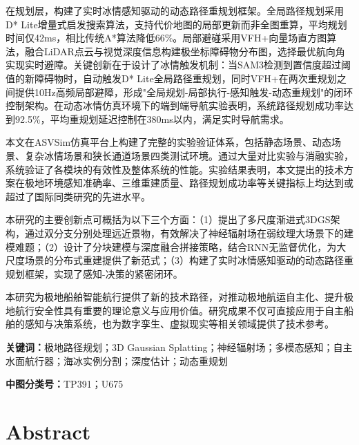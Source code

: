 \documentclass[12pt,a4paper]{ctexbook}
\begin{document}
在规划层，构建了实时冰情感知驱动的动态路径重规划框架。全局路径规划采用D* Lite增量式启发搜索算法，支持代价地图的局部更新而非全图重算，平均规划时间仅42ms，相比传统A*算法降低66\%。局部避碰采用VFH+向量场直方图算法，融合LiDAR点云与视觉深度信息构建极坐标障碍物分布图，选择最优航向角实现实时避障。关键创新在于设计了冰情触发机制：当SAM3检测到置信度超过阈值的新障碍物时，自动触发D* Lite全局路径重规划，同时VFH+在两次重规划之间提供10Hz高频局部避障，形成"全局规划-局部执行-感知触发-动态重规划"的闭环控制架构。在动态冰情仿真环境下的端到端导航实验表明，系统路径规划成功率达到92.5\%，平均重规划延迟控制在380ms以内，满足实时导航需求。

本文在ASVSim仿真平台上构建了完整的实验验证体系，包括静态场景、动态场景、复杂冰情场景和狭长通道场景四类测试环境。通过大量对比实验与消融实验，系统验证了各模块的有效性及整体系统的性能。实验结果表明，本文提出的技术方案在极地环境感知准确率、三维重建质量、路径规划成功率等关键指标上均达到或超过了国际同类研究的先进水平。

本研究的主要创新点可概括为以下三个方面：（1）提出了多尺度渐进式3DGS架构，通过双分支分别处理远近景物，有效解决了神经辐射场在弱纹理大场景下的建模难题；（2）设计了分块建模与深度融合拼接策略，结合RNN无监督优化，为大尺度场景的分布式重建提供了新范式；（3）构建了实时冰情感知驱动的动态路径重规划框架，实现了感知-决策的紧密闭环。

本研究为极地船舶智能航行提供了新的技术路径，对推动极地航运自主化、提升极地航行安全性具有重要的理论意义与应用价值。研究成果不仅可直接应用于自主船舶的感知与决策系统，也为数字孪生、虚拟现实等相关领域提供了技术参考。

\vspace{1.5em}
\noindent\textbf{关键词：}极地路径规划；3D Gaussian Splatting；神经辐射场；多模态感知；自主水面航行器；海冰实例分割；深度估计；动态重规划

\vspace{1em}
\noindent\textbf{中图分类号：}TP391；U675

\newpage

\chapter*{Abstract}
\end{document}
